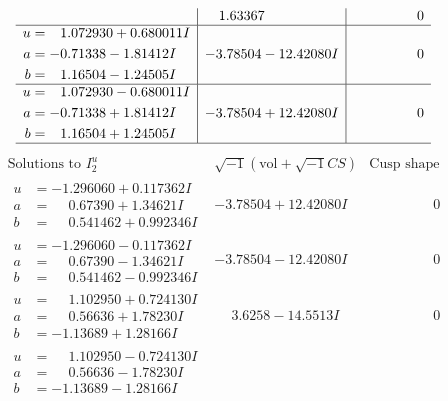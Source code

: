 \documentclass[1p]{elsarticle_modified}
\theoremstyle{definition}
\newcommand{\I}{\sqrt{-1}}
\begin{document}
$$\begin{array}{c|c|c}
 & \phantom{-}1.63367\phantom{ +0.000000I} & \phantom{-0.000000 } 0 \\ \hline\begin{aligned}
u &= \phantom{-}1.072930 + 0.680011 I \\
a &= -0.71338 - 1.81412 I \\
b &= \phantom{-}1.16504 - 1.24505 I\end{aligned}
 & -3.78504 - 12.42080 I & \phantom{-0.000000 } 0 \\ \hline\begin{aligned}
u &= \phantom{-}1.072930 - 0.680011 I \\
a &= -0.71338 + 1.81412 I \\
b &= \phantom{-}1.16504 + 1.24505 I\end{aligned}
 & -3.78504 + 12.42080 I & \phantom{-0.000000 } 0\\
 \hline 
 \end{array}$$\newpage$$\begin{array}{c|c|c}  
\text{Solutions to }I^u_{2}& \I (\text{vol} + \sqrt{-1}CS) & \text{Cusp shape}\\
 \hline 
\begin{aligned}
u &= -1.296060 + 0.117362 I \\
a &= \phantom{-}0.67390 + 1.34621 I \\
b &= \phantom{-}0.541462 + 0.992346 I\end{aligned}
 & -3.78504 + 12.42080 I & \phantom{-0.000000 } 0 \\ \hline\begin{aligned}
u &= -1.296060 - 0.117362 I \\
a &= \phantom{-}0.67390 - 1.34621 I \\
b &= \phantom{-}0.541462 - 0.992346 I\end{aligned}
 & -3.78504 - 12.42080 I & \phantom{-0.000000 } 0 \\ \hline\begin{aligned}
u &= \phantom{-}1.102950 + 0.724130 I \\
a &= \phantom{-}0.56636 + 1.78230 I \\
b &= -1.13689 + 1.28166 I\end{aligned}
 & \phantom{-}3.6258 - 14.5513 I & \phantom{-0.000000 } 0 \\ \hline\begin{aligned}
u &= \phantom{-}1.102950 - 0.724130 I \\
a &= \phantom{-}0.56636 - 1.78230 I \\
b &= -1.13689 - 1.28166 I\end{aligned}

\end{array}$$
\end{document}
